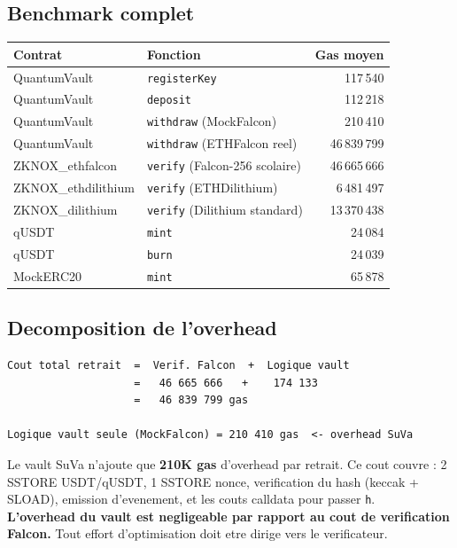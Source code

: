 \documentclass[11pt,a4paper]{article}
\begin{document}
\subsection{Benchmark complet}

\begin{center}
\begin{tabular}{llr}
\toprule
\textbf{Contrat} & \textbf{Fonction} & \textbf{Gas moyen} \\
\midrule
QuantumVault & \texttt{registerKey}                   &     117\,540 \\
QuantumVault & \texttt{deposit}                       &     112\,218 \\
QuantumVault & \texttt{withdraw} (MockFalcon)         &     210\,410 \\
QuantumVault & \texttt{withdraw} (ETHFalcon reel)     &  46\,839\,799 \\
\midrule
ZKNOX\_ethfalcon    & \texttt{verify} (Falcon-256 scolaire) & 46\,665\,666 \\
ZKNOX\_ethdilithium & \texttt{verify} (ETHDilithium)        &  6\,481\,497 \\
ZKNOX\_dilithium    & \texttt{verify} (Dilithium standard)  & 13\,370\,438 \\
\midrule
qUSDT     & \texttt{mint}  & 24\,084 \\
qUSDT     & \texttt{burn}  & 24\,039 \\
MockERC20 & \texttt{mint}  & 65\,878 \\
\bottomrule
\end{tabular}
\end{center}

\subsection{Decomposition de l'overhead}

\begin{lstlisting}[style=bash, caption={Decomposition de l'overhead du vault}]
Cout total retrait  =  Verif. Falcon  +  Logique vault
                    =   46 665 666   +    174 133
                    =   46 839 799 gas

Logique vault seule (MockFalcon) = 210 410 gas  <- overhead SuVa
\end{lstlisting}

\begin{infobox}[Interpretation]
Le vault SuVa n'ajoute que \textbf{210K gas} d'overhead par retrait. Ce cout couvre :
2 SSTORE USDT/qUSDT, 1 SSTORE nonce, verification du hash (keccak + SLOAD), emission d'evenement,
et les couts calldata pour passer \texttt{h}.\\[4pt]
\textbf{L'overhead du vault est negligeable par rapport au cout de verification Falcon.}
Tout effort d'optimisation doit etre dirige vers le verificateur.
\end{infobox}
\end{document}
